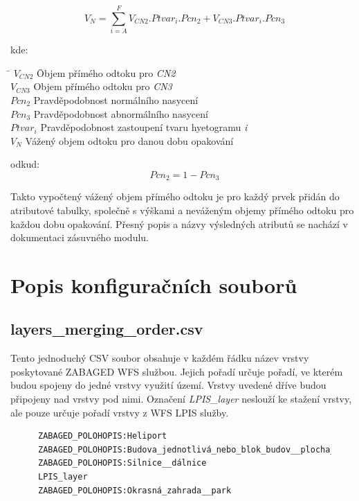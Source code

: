 \documentclass[a4paper,oneside,12pt]{book}
\begin{document}
\begin{equation}
V_{N} = \sum_{i = A}^{F} \mathit{V}_{CN2} . Ptvar_{i} . Pcn_{2} + \mathit{V}_{CN3} . Ptvar_{i} . Pcn_{3}
\end{equation}

kde:
\begin{tabbing}
    \hspace{10mm} \= $\mathit{V}_{CN2}$ \hspace{5mm} \= Objem přímého odtoku pro \textit{CN2} \\
    \> $\mathit{V}_{CN3}$ \> Objem přímého odtoku pro \textit{CN3} \\ 
    \> $Pcn_{2}$  \> Pravděpodobnost normálního nasycení \\
    \> $Pcn_{3}$ \> Pravděpodobnost abnormálního nasycení \\
    \> $Ptvar_{i}$ \> Pravděpodobnost zastoupení tvaru hyetogramu \textit{i} \\
    \> $V_{N}$ \> Vážený objem odtoku pro danou dobu opakování 
\end{tabbing}
odkud: 
\begin{equation}
Pcn_{2} = 1 -  Pcn_{3}
\end{equation}

\hspace{10mm} Takto vypočtený vážený objem přímého odtoku je pro každý prvek přidán do atributové tabulky, společně s výškami a neváženým objemy přímého odtoku  pro každou dobu opakování. Přesný popis a názvy výsledných atributů se nachází v dokumentaci zásuvného modulu. %

\section{Popis konfiguračních souborů} \label{config}
\subsection{layers\_merging\_order.csv} \label{layers_merging_order.csv}
\hspace{10mm}Tento jednoduchý CSV soubor obsahuje v každém řádku název vrstvy poskytované ZABAGED WFS službou. Jejich pořadí určuje pořadí, ve kterém budou spojeny do jedné vrstvy využití území. Vrstvy uvedené dříve budou připojeny nad vrstvy pod nimi. Označení \textit{LPIS\_layer} neslouží ke stažení vrstvy, ale pouze určuje pořadí vrstvy z WFS LPIS služby.

\begin{figure}[H]
\begin{lstlisting}[style=mypython, caption={Ukázka layers\_merging\_order.csv},label={kod:layers_merging_order.csv}]
ZABAGED_POLOHOPIS:Heliport
ZABAGED_POLOHOPIS:Budova_jednotlivá_nebo_blok_budov__plocha_
ZABAGED_POLOHOPIS:Silnice__dálnice
LPIS_layer
ZABAGED_POLOHOPIS:Okrasná_zahrada__park
\end{lstlisting}
\end{figure}
\end{document}
